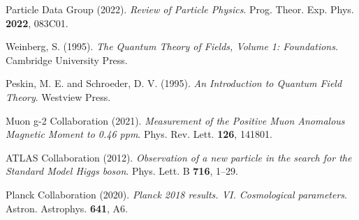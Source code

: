 \documentclass[12pt,a4paper]{article}
\begin{document}
\begin{thebibliography}{99}
		Particle Data Group (2022). \textit{Review of Particle Physics}. Prog. Theor. Exp. Phys. \textbf{2022}, 083C01.
		
		Weinberg, S. (1995). \textit{The Quantum Theory of Fields, Volume 1: Foundations}. Cambridge University Press.
		
		Peskin, M. E. and Schroeder, D. V. (1995). \textit{An Introduction to Quantum Field Theory}. Westview Press.
		
		Muon g-2 Collaboration (2021). \textit{Measurement of the Positive Muon Anomalous Magnetic Moment to 0.46 ppm}. Phys. Rev. Lett. \textbf{126}, 141801.
		
		ATLAS Collaboration (2012). \textit{Observation of a new particle in the search for the Standard Model Higgs boson}. Phys. Lett. B \textbf{716}, 1--29.
		
		Planck Collaboration (2020). \textit{Planck 2018 results. VI. Cosmological parameters}. Astron. Astrophys. \textbf{641}, A6.
	\end{thebibliography}
	
\end{document}

